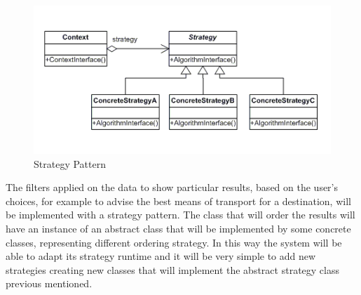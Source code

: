 \begin{figure}[H]
	\centering
	\includegraphics[scale=0.7]{Images/Patterns/Strategy_Pattern}
	\caption{Strategy Pattern}
\end{figure}
The filters applied on the data to show particular results, based on the user’s choices, for example to advise the best means of transport for a destination, will be implemented with a strategy pattern. The class that will order the results will have an instance of an abstract class that will be implemented by some concrete classes, representing different ordering strategy. In this way the system will be able to adapt its strategy runtime and it will be very simple to add new strategies creating new classes that will implement the abstract strategy class previous mentioned.

